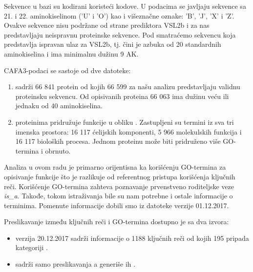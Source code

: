 
Sekvence u bazi \swissprot su kodirani koristeći 
kodove.  U podacima se javljaju sekvence sa  21. i 22. aminokiselinom ('U' i 'O')
kao i  višeznačne oznake: 'B', 'J', 'X' i 'Z'.  Ovakve sekvence nisu podržane od
strane prediktora VSL2b i za nas predstavljaju neispravnu proteinske sekvence. Pod
 smatraćemo sekvencu koja predstavlja
ispravan ulaz za VSL2b, tj. čini je azbuka od 20 standardnih aminokiselina i
ima minimalnu dužinu 9 AK.

CAFA3-podaci se sastoje od dve datoteke:
\begin{enumerate}
  \item {}  sadrži 66 841 protein od kojih 66 599
    za našu analizu predstavljaju validnu proteinsku sekvencu. Od opisivanih
    proteina 66 063 ima dužinu veću ili jednaku od 40 aminokiselina.
  \item {} proteinima pridružuje funkcije u obliku 
    . Zastupljeni su termini iz sva tri imenska prostora:
    16 117 ćelijskih komponenti, 5 966 molekulskih funkcija i 16 117 bioloških
    procesa. Jednom proteinu može biti pridruženo više GO-termina i obrnuto.
\end{enumerate}

Analiza u ovom radu je primarno orijentisna ka korišćenju GO-termina za opisivanje
funkcije što je razlikuje od referentnog pristupa korišćenja ključnih reči.
Korišćenje GO-termina zahteva poznavanje prvenstveno  roditeljske veze
\textit{is\_a}.  Takođe, tokom istraživanja bile su nam potrebne
i ostale informacije o terminima. Pomenute informacije dobili smo iz datoteke
 \cite{go_obo} verzije 01.12.2017.

Preslikavanje između ključnih reči i GO-termina dostupno je sa dva izvora:
\begin{itemize}
  \item {}\cite{keywlist_txt} verzija 20.12.2017 sadrži
    informacije o 1188 ključnih reči od kojih 195 pripada kategoriji
    .
  \item {}\cite{uniprotkb_kw2go} sadrži samo preslikavanja a
    generiše ih  \parencite{Barrell2009}. 
\end{itemize}

